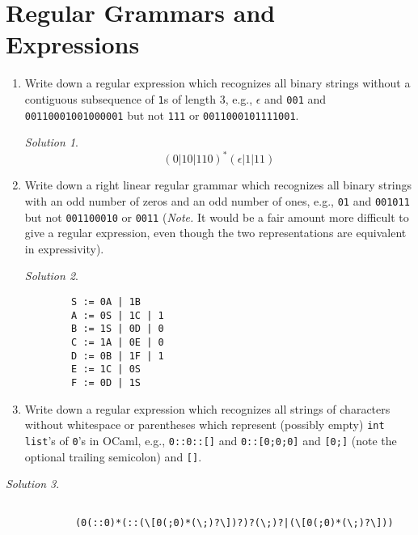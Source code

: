 \documentclass{article}
\theoremstyle{remark} \newtheorem*{solution}{Solution}
\begin{document}
\section{Regular Grammars and Expressions}
\begin{enumerate}
\item Write down a regular expression which recognizes all binary strings without a contiguous subsequence of \texttt{1}s of length $3$, e.g., $\epsilon$ and \texttt{001} and \texttt{00110001001000001} but not \texttt{111} or \texttt{0011000101111001}.

\begin{mdframed}
    \begin{solution}
        \[(0|10|110)^{*} ( \epsilon|1|11)\]
    \end{solution}
\end{mdframed}

\item Write down a right linear regular grammar which recognizes all binary strings with an odd number of zeros and an odd number of ones, e.g., \texttt{01} and \texttt{001011} but not \texttt{001100010} or \texttt{0011} (\textit{Note.} It would be a fair amount more difficult to give a regular expression, even though the two representations are equivalent in expressivity).
\begin{mdframed}
    \begin{solution}
    \begin{lstlisting}
        S := 0A | 1B
        A := 0S | 1C | 1
        B := 1S | 0D | 0
        C := 1A | 0E | 0
        D := 0B | 1F | 1
        E := 1C | 0S
        F := 0D | 1S
    \end{lstlisting}
    \end{solution}
\end{mdframed}


\item Write down a regular expression which recognizes all strings of characters without whitespace or parentheses which represent (possibly empty) \texttt{int list}'s of \texttt{0}'s in OCaml, e.g., \texttt{0::0::[]} and \texttt{{0::[0;0;0]}} and \texttt{[0;]} (note the optional trailing semicolon) and \texttt{[]}.
\end{enumerate}
\begin{mdframed}
    \begin{solution}
        \begin{lstlisting}
            
            (0(::0)*(::(\[0(;0)*(\;)?\])?)?(\;)?|(\[0(;0)*(\;)?\]))
        \end{lstlisting}
    \end{solution}
\end{mdframed}
\end{document}
